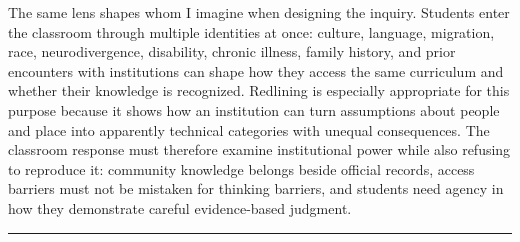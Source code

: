 \documentclass[11pt]{article}
\newcommand{\projectsection}[1]{\par\Needspace{5\baselineskip}\addvspace{0.10in}\noindent{\Large\bfseries\color{PrimaryRed}#1}\par\vspace{0.02in}\color{DeepNavy}\hrule\color{black}\vspace{0.08in}}
\begin{document}
The same lens shapes whom I imagine when designing the inquiry. Students enter the classroom through multiple identities at once: culture, language, migration, race, neurodivergence, disability, chronic illness, family history, and prior encounters with institutions can shape how they access the same curriculum and whether their knowledge is recognized. Redlining is especially appropriate for this purpose because it shows how an institution can turn assumptions about people and place into apparently technical categories with unequal consequences. The classroom response must therefore examine institutional power while also refusing to reproduce it: community knowledge belongs beside official records, access barriers must not be mistaken for thinking barriers, and students need agency in how they demonstrate careful evidence-based judgment.

\newpage
\projectsection{References}
\small


\end{document}
